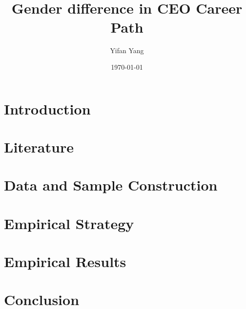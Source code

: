 \documentclass[10pt]{article}
\title{Gender difference in CEO Career Path}
\author{Yifan Yang}
\date{\today}
\begin{document}
\maketitle

\section{Introduction}


\section{Literature}


\section{Data and Sample Construction}


\section{Empirical Strategy}


\section{Empirical Results}


\section{Conclusion}




\newpage
\begin{appendices}


\end{appendices}
\end{document}
